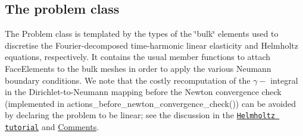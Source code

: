  

\hypertarget{index_class}{}\subsection{The problem class}\label{index_class}
The {\ttfamily Problem} class is templated by the types of the \char`\"{}bulk\char`\"{} elements used to discretise the Fourier-\/decomposed time-\/harmonic linear elasticity and Helmholtz equations, respectively. It contains the usual member functions to attach {\ttfamily Face\+Elements} to the bulk meshes in order to apply the various Neumann boundary conditions. We note that the costly recomputation of the $ \gamma- $ integral in the Dirichlet-\/to-\/\+Neumann mapping before the Newton convergence check (implemented in {\ttfamily actions\+\_\+before\+\_\+newton\+\_\+convergence\+\_\+check()}) can be avoided by declaring the problem to be linear; see the discussion in the \href{../../../fourier_decomposed_helmholtz/sphere_scattering/html/index.html#DtN}{\tt Helmholtz tutorial} and \hyperlink{index_comm}{Comments}.


